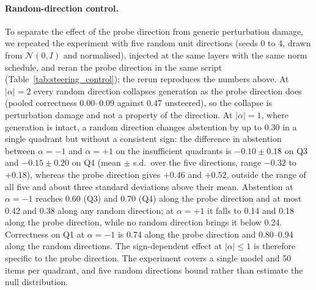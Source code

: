 \documentclass[acmsmall,screen,review]{acmart}
\begin{document}
\paragraph{Random-direction control.} To separate the effect of the probe direction from generic perturbation damage, we repeated the experiment with five random unit directions (seeds 0 to 4, drawn from $\mathcal{N}(0, I)$ and normalised), injected at the same layers with the same norm schedule, and reran the probe direction in the same script (Table~\ref{tab:steering_control}); the rerun reproduces the numbers above. At $|\alpha| = 2$ every random direction collapses generation as the probe direction does (pooled correctness 0.00--0.09 against 0.47 unsteered), so the collapse is perturbation damage and not a property of the direction. At $|\alpha| = 1$, where generation is intact, a random direction changes abstention by up to 0.30 in a single quadrant but without a consistent sign: the difference in abstention between $\alpha = -1$ and $\alpha = +1$ on the insufficient quadrants is $-0.10 \pm 0.18$ on Q3 and $-0.15 \pm 0.20$ on Q4 (mean $\pm$ s.d.\ over the five directions, range $-0.32$ to $+0.18$), whereas the probe direction gives $+0.46$ and $+0.52$, outside the range of all five and about three standard deviations above their mean. Abstention at $\alpha = -1$ reaches 0.60 (Q3) and 0.70 (Q4) along the probe direction and at most 0.42 and 0.38 along any random direction; at $\alpha = +1$ it falls to 0.14 and 0.18 along the probe direction, while no random direction brings it below 0.24. Correctness on Q1 at $\alpha = -1$ is 0.74 along the probe direction and 0.80--0.94 along the random directions. The sign-dependent effect at $|\alpha| \leq 1$ is therefore specific to the probe direction. The experiment covers a single model and 50 items per quadrant, and five random directions bound rather than estimate the null distribution.
\end{document}
